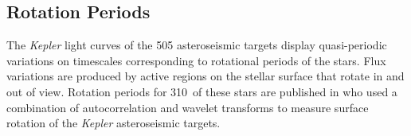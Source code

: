 \documentclass[10pt,preprint]{aastex}
\newcommand{\ngarcia}{310~}
\begin{document}
\subsection{Rotation Periods}
\label{sec:rotation_periods}

The {\it Kepler} light curves of the 505 asteroseismic targets display quasi-periodic variations on timescales corresponding to rotational periods of the stars.
Flux variations are produced by active regions on the stellar surface that rotate in and out of view.
Rotation periods for \ngarcia of these stars are published in \citet{Garcia2014} who used a combination of autocorrelation and wavelet transforms to measure surface rotation of the {\it Kepler} asteroseismic targets.
\end{document}
